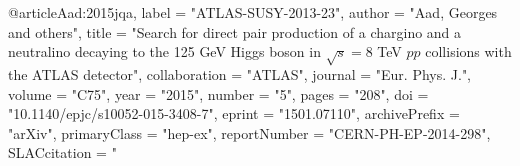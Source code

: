 @article{Aad:2015jqa,
      label          = "ATLAS-SUSY-2013-23",
      author         = "Aad, Georges and others",
      title          = "{Search for direct pair production of a chargino and a
                        neutralino decaying to the 125 GeV Higgs boson in
                        $\sqrt{s} = 8$  TeV ${pp}$ collisions with the ATLAS
                        detector}",
      collaboration  = "ATLAS",
      journal        = "Eur. Phys. J.",
      volume         = "C75",
      year           = "2015",
      number         = "5",
      pages          = "208",
      doi            = "10.1140/epjc/s10052-015-3408-7",
      eprint         = "1501.07110",
      archivePrefix  = "arXiv",
      primaryClass   = "hep-ex",
      reportNumber   = "CERN-PH-EP-2014-298",
      SLACcitation   = "%
}

